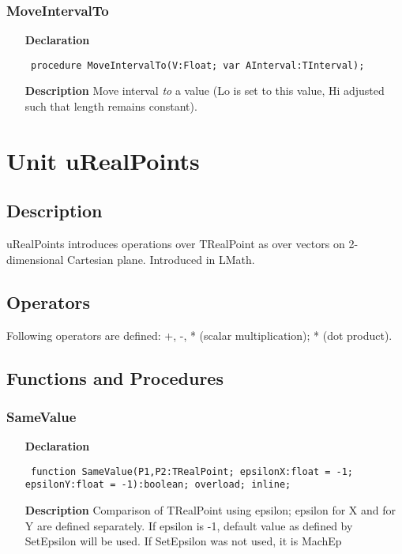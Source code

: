 \documentclass[12pt,a4paper,oneside]{report}
\newcommand{\lmath}[1]{   %
	\marginpar{\vspace{#1} 
		\begin{flushright}
			LMath
	\end{flushright} }
}
\newcommand{\declarationitem}[1]{\textbf{#1}}
\newcommand{\descriptiontitle}[1]{\textbf{#1}}
\newcommand{\code}[1]{\texttt{#1}}
\begin{document}
\subsubsection{MoveIntervalTo}
\label{uIntervals-MoveIntervalTo}
\begin{itemize}\item[\declarationitem{Declaration}\hfill]
	\begin{flushleft}
		\code{
			procedure MoveIntervalTo(V:Float; var AInterval:TInterval);}
	\end{flushleft}
	\item[\descriptiontitle{Description}]
	Move interval \textit{to} a value (Lo is set to this value, Hi adjusted such that length remains constant).
\end{itemize}

\section{Unit uRealPoints}\lmath{-24pt}
\label{uRealPoints}
\subsection{Description}
uRealPoints introduces operations over TRealPoint as over vectors on 2-dimensional Cartesian plane. Introduced in LMath.
\subsection{Operators} 
Following operators are defined:
+, -, * (scalar multiplication); * (dot product). 
\subsection{Functions and Procedures}
\subsubsection{SameValue}
\label{uRealPoints-SameValue}
\begin{itemize}\item[\declarationitem{Declaration}\hfill]
\begin{flushleft}
\code{
function SameValue(P1,P2:TRealPoint; epsilonX:float = -1; epsilonY:float = -1):boolean; overload; inline;}
\end{flushleft}
\par
\item[\descriptiontitle{Description}]
Comparison of TRealPoint using epsilon; epsilon for X and for Y are defined separately. If epsilon is {-}1, default value as defined by SetEpsilon will be used. If SetEpsilon was not used, it is MachEp
\end{itemize}
\end{document}
